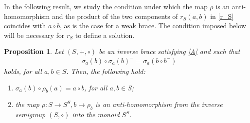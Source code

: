 \documentclass[preprint,1p]{elsarticle}
\newtheorem{prop}[theor]{Proposition}
\theoremstyle{definition}               %
\begin{document}
\smallskip


In the following result, we study the condition under which the map $\rho$ is an anti-homomorphism and the product of the two components of $r_S(a,b)$ in \eqref{r_S} coincides with $a \circ b$, as is the case for a weak brace. The condition imposed below will be necessary for $r_S$ to define a solution. 
\begin{prop}\label{condizione_a_2}
  Let $(S, +, \circ)$ be an inverse brace satisfying \eqref{A} and such that \begin{align}
    &\sigma_a(b)\circ \sigma_a(b)^-=\sigma_a\left(b \circ b^-\right) 
    \tag{II}\label{B}
    \end{align}
    holds, for all $a, b \in S$. Then, the following hold:
    \begin{enumerate}
        \item[\rm{(1)}] $\sigma_a(b)\circ \rho_b(a)=a \circ b$, for all $a, b \in S$;
        \item[\rm{(2)}] the map $\rho: S \to S^S, b \mapsto \rho_b$
    is an anti-homomorphism from the inverse semigroup $(S, \circ)$ into the monoid $S^S$.
    \end{enumerate}
\end{prop}
\end{document}
